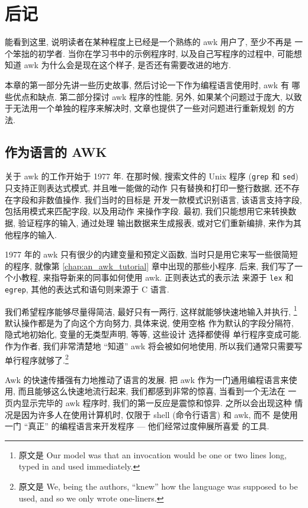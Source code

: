 \chapter{后记}
\label{chap:epilog}

能看到这里, 说明读者在某种程度上已经是一个熟练的 awk 用户了, 至少不再是
一个笨拙的初学者. 当你在学习书中的示例程序时, 以及自己写程序的过程中, 
可能想知道 awk 为什么会是现在这个样子, 是否还有需要改进的地方.

本章的第一部分先讲一些历史故事, 然后讨论一下作为编程语言使用时, awk 有
哪些优点和缺点. 第二部分探讨 awk 程序的性能, 另外, 如果某个问题过于庞大,
以致于无法用一个单独的程序来解决时, 文章也提供了一些对问题进行重新规划
的方法.

\section{作为语言的 AWK}
\label{sec:awk_as_a_language}

关于 awk 的工作开始于 1977 年. 在那时候, 搜索文件的 Unix 程序
(\texttt{grep} 和 \texttt{sed}) 只支持正则表达式模式, 并且唯一能做的动作
只有替换和打印一整行数据, 还不存在字段和非数值操作. 我们当时的目标是
开发一款模式识别语言, 该语言支持字段, 包括用模式来匹配字段, 以及用动作
来操作字段. 最初, 我们只能想用它来转换数据, 验证程序的输入, 通过处理
输出数据来生成报表, 或对它们重新编排, 来作为其他程序的输入.

1977 年的 awk 只有很少的内建变量和预定义函数, 当时只是用它来写一些很简短
的程序, 就像第 \ref{chap:an_awk_tutorial} 章中出现的那些小程序. 后来,
我们写了一个小教程, 来指导新来的同事如何使用 awk. 正则表达式的表示法
来源于 \texttt{lex} 和 \texttt{egrep}, 其他的表达式和语句则来源于 C
语言.

我们希望程序能够尽量得简洁, 最好只有一两行, 这样就能够快速地输入并执行,
\footnote{ 原文是 Our model was that an invocation would be one or two
    lines long, typed in and used immediately.}
    默认操作都是为了向这个方向努力, 具体来说, 使用空格
作为默认的字段分隔符, 隐式地初始化, 变量的无类型声明, 等等, 这些设计
选择都使得 单行程序变成可能. 作为作者, 我们非常清楚地 ``知道'' awk
将会被如何地使用, 所以我们通常只需要写单行程序就够了.\footnote{原文是 We,
    being the authors, ``knew'' how the language was supposed to be used,
    and so we only wrote one-liners.}

Awk 的快速传播强有力地推动了语言的发展. 把 awk 作为一门通用编程语言来使用,
而且能够这么快速地流行起来, 我们都感到非常的惊喜, 当看到一个无法在
一页内显示完毕的 awk 程序时, 我们的第一反应是震惊和惊异. 之所以会出现这种
情况是因为许多人在使用计算机时, 仅限于 shell (命令行语言) 和 awk, 而不
是使用一门 ``真正'' 的编程语言来开发程序 --- 他们经常过度伸展所喜爱
的工具.

